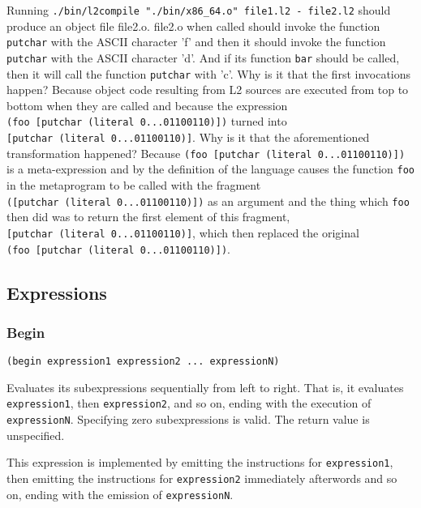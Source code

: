 \documentclass[]{article}
\begin{document}
Running
\texttt{./bin/l2compile\ "./bin/x86\_64.o"\ file1.l2\ -\ file2.l2}
should produce an object file file2.o. file2.o when called should invoke
the function \texttt{putchar} with the ASCII character 'f' and then it
should invoke the function \texttt{putchar} with the ASCII character
'd'. And if its function \texttt{bar} should be called, then it will
call the function \texttt{putchar} with 'c'. Why is it that the first
invocations happen? Because object code resulting from L2 sources are
executed from top to bottom when they are called and because the
expression \texttt{(foo\ {[}putchar\ (literal\ 0...01100110){]})} turned
into \texttt{{[}putchar\ (literal\ 0...01100110){]}}. Why is it that the
aforementioned transformation happened? Because
\texttt{(foo\ {[}putchar\ (literal\ 0...01100110){]})} is a
meta-expression and by the definition of the language causes the
function \texttt{foo} in the metaprogram to be called with the fragment
\texttt{({[}putchar\ (literal\ 0...01100110){]})} as an argument and the
thing which \texttt{foo} then did was to return the first element of
this fragment, \texttt{{[}putchar\ (literal\ 0...01100110){]}}, which
then replaced the original
\texttt{(foo\ {[}putchar\ (literal\ 0...01100110){]})}.

\hypertarget{expressions}{%
\subsection{Expressions}\label{expressions}}

\hypertarget{begin}{%
\subsubsection{Begin}\label{begin}}

\begin{verbatim}
(begin expression1 expression2 ... expressionN)
\end{verbatim}

Evaluates its subexpressions sequentially from left to right. That is,
it evaluates \texttt{expression1}, then \texttt{expression2}, and so on,
ending with the execution of \texttt{expressionN}. Specifying zero
subexpressions is valid. The return value is unspecified.

This expression is implemented by emitting the instructions for
\texttt{expression1}, then emitting the instructions for
\texttt{expression2} immediately afterwords and so on, ending with the
emission of \texttt{expressionN}.
\end{document}
